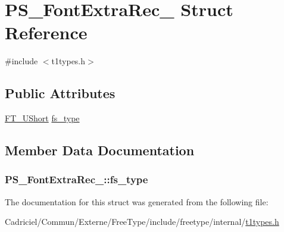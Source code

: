\hypertarget{struct_p_s___font_extra_rec__}{\section{P\-S\-\_\-\-Font\-Extra\-Rec\-\_\- Struct Reference}
\label{struct_p_s___font_extra_rec__}
}


{\ttfamily \#include $<$t1types.\-h$>$}

\subsection*{Public Attributes}
\begin{DoxyCompactItemize}
\item 
\hyperlink{fttypes_8h_a937f6c17cf5ffd09086d8610c37b9f58}{F\-T\-\_\-\-U\-Short} \hyperlink{struct_p_s___font_extra_rec___a048e1e57ee974c3e05e9a88476e6b8a9}{fs\-\_\-type}
\end{DoxyCompactItemize}


\subsection{Member Data Documentation}
\hypertarget{struct_p_s___font_extra_rec___a048e1e57ee974c3e05e9a88476e6b8a9}{
\subsubsection[{fs\-\_\-type}]{ P\-S\-\_\-\-Font\-Extra\-Rec\-\_\-\-::fs\-\_\-type}}\label{struct_p_s___font_extra_rec___a048e1e57ee974c3e05e9a88476e6b8a9}


The documentation for this struct was generated from the following file\-:\begin{DoxyCompactItemize}
\item 
Cadriciel/\-Commun/\-Externe/\-Free\-Type/include/freetype/internal/\hyperlink{t1types_8h}{t1types.\-h}\end{DoxyCompactItemize}

